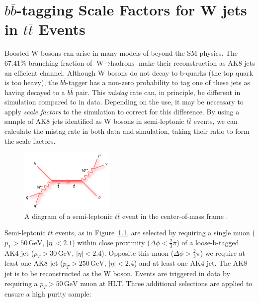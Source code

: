 \chapter{$b\bar{b}$-tagging Scale Factors for W jets in $t\bar{t}$ Events}

Boosted W bosons can arise in many models of beyond the SM physics. The 67.41\% branching fraction of $\textrm{W} \rightarrow \textrm{hadrons}$ make their reconstruction as AK8 jets an efficient channel. Although W bosons do not decay to b-quarks (the top quark is too heavy), the $b\bar{b}$-tagger has a non-zero probability to tag one of these jets as having decayed to a $b\bar{b}$ pair. This \textit{mistag} rate can, in principle, be different in simulation compared to in data. Depending on the use, it may be necessary to apply \textit{scale factors} to the simulation to correct for this difference. By using a sample of AK8 jets identified as W bosons in semi-leptonic $t\bar{t}$ events, we can calculate the mistag rate in both data and simulation, taking their ratio to form the scale factors.

\begin{figure}[hbp!]
\centering
\includegraphics[width=0.4\textwidth]{figs/feynman_ttbar_ljets_beamline.png}
\caption[A diagram of a semi-leptonic $t\bar{t}$ event in the center-of-mass frame.]{A diagram of a semi-leptonic $t\bar{t}$ event in the center-of-mass frame \cite{ttbar}.}
\label{fig:ttbar}
\end{figure}

Semi-leptonic $t\bar{t}$ events, as in Figure~\ref{fig:ttbar}, are selected by requiring a single muon ($p_{T}>50\,\textrm{GeV}$, $|\eta|<2.1$) within close proximity ($\Delta\phi<\frac{2}{3}\pi$) of a loose-b-tagged AK4 jet ($p_{T}>30\,\textrm{GeV}$, $|\eta|<2.4$). Opposite this muon ($\Delta\phi>\frac{2}{3}\pi$) we require at least one AK8 jet ($p_{T}>250\,\textrm{GeV}$, $|\eta|<2.4$) and at least one AK4 jet. The AK8 jet is to be reconstructed as the W boson. Events are triggered in data by requiring a $p_{T}>50\,\textrm{GeV}$ muon at HLT. Three additional selections are applied to ensure a high purity sample:

